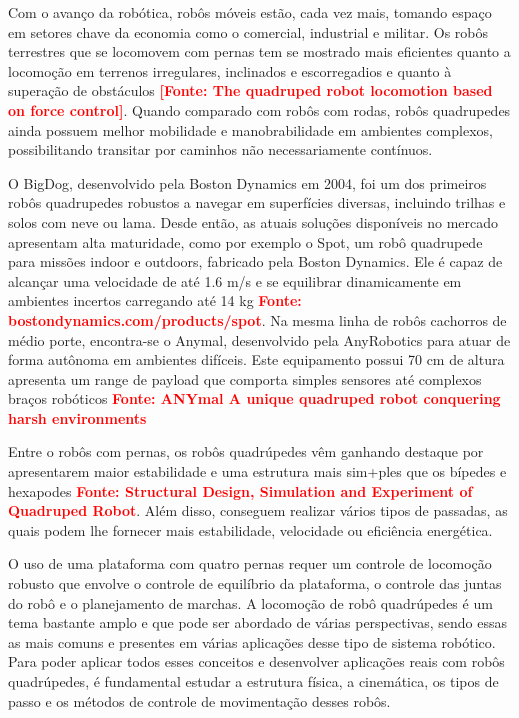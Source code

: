 \documentclass[../main.tex]{subfiles}
\begin{document}
  Com o avanço da robótica, robôs móveis estão, cada vez mais, tomando espaço em setores chave da economia como o comercial, industrial e militar. Os robôs terrestres que se locomovem com pernas tem se mostrado mais eficientes quanto a locomoção em terrenos irregulares, inclinados e escorregadios e quanto à superação de obstáculos \textbf{\textcolor{red}{[Fonte: The quadruped robot locomotion based on force control]}}.  Quando comparado com robôs com rodas, robôs quadrupedes ainda possuem melhor mobilidade e manobrabilidade em ambientes complexos, possibilitando transitar por caminhos não necessariamente contínuos.
          
  O BigDog, desenvolvido pela Boston Dynamics em 2004, foi um dos primeiros robôs quadrupedes  robustos a navegar em superfícies diversas, incluindo trilhas e solos com neve ou lama. Desde então, as atuais soluções disponíveis no mercado apresentam alta maturidade, como por exemplo o Spot, um robô quadrupede para missões indoor e outdoors, fabricado pela Boston Dynamics. Ele é capaz de alcançar uma velocidade de até 1.6 m/s e se equilibrar dinamicamente em ambientes incertos carregando até 14 kg \textbf{\textcolor{red}{Fonte: bostondynamics.com/products/spot}}.  Na mesma linha de robôs cachorros de médio porte, encontra-se o Anymal, desenvolvido pela AnyRobotics para atuar de forma autônoma em ambientes difíceis. Este equipamento possui 70 cm de altura apresenta um range de payload que comporta simples sensores até complexos braços robóticos \textbf{\textcolor{red}{Fonte: ANYmal A unique quadruped robot conquering harsh environments}}

  Entre o robôs com pernas, os robôs quadrúpedes vêm ganhando destaque por apresentarem maior estabilidade e uma estrutura mais sim+ples que os bípedes e hexapodes \textbf{\textcolor{red}{Fonte: Structural Design, Simulation and Experiment of Quadruped Robot}}. Além disso, conseguem realizar vários tipos de passadas, as quais podem lhe fornecer mais estabilidade, velocidade ou eficiência energética. 

  O uso de uma plataforma com quatro pernas requer um controle de locomoção robusto que envolve o controle de equilíbrio da plataforma, o controle das juntas do robô e o planejamento de marchas. A locomoção de robô quadrúpedes é um tema bastante amplo e que pode ser abordado de várias perspectivas, sendo essas as mais comuns e presentes em várias aplicações desse tipo de sistema robótico. Para poder aplicar todos esses conceitos e desenvolver aplicações reais com robôs quadrúpedes, é fundamental estudar a estrutura física, a cinemática, os tipos de passo e os métodos de controle de movimentação desses robôs. 
\end{document}
